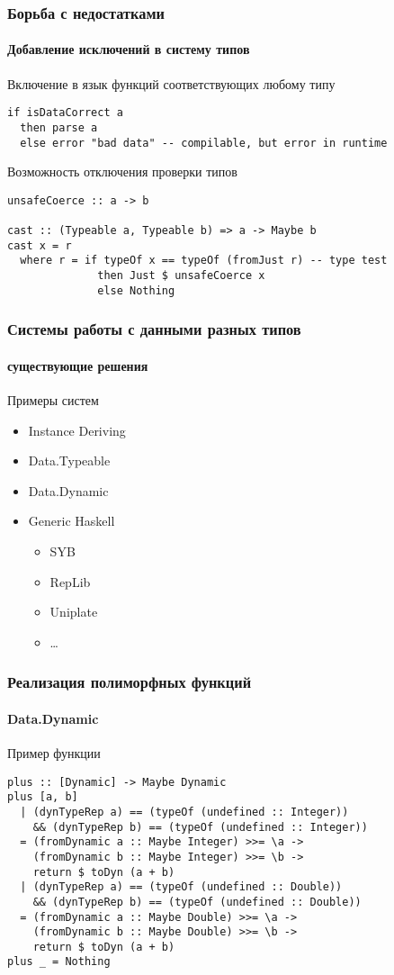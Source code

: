 \documentclass[ucs]{beamer}
\begin{document}

\begin{frame}[fragile]
  \frametitle{Борьба с недостатками}
  \framesubtitle{Добавление исключений в систему типов}

  \begin{block}{Включение в язык функций соответствующих любому типу}
\begin{verbatim}
if isDataCorrect a
  then parse a
  else error "bad data" -- compilable, but error in runtime
\end{verbatim}
  \end{block}

  \begin{block}{Возможность отключения проверки типов}
\begin{verbatim}
unsafeCoerce :: a -> b

cast :: (Typeable a, Typeable b) => a -> Maybe b
cast x = r
  where r = if typeOf x == typeOf (fromJust r) -- type test
              then Just $ unsafeCoerce x
              else Nothing
\end{verbatim}
  \end{block}
\end{frame}

\begin{frame}[fragile]
  \frametitle{Системы работы с данными разных типов}
  \framesubtitle{существующие решения}

  \begin{block}{Примеры систем}
    \begin{itemize}
    \item Instance Deriving
    \item Data.Typeable
    \item Data.Dynamic
    \item Generic Haskell
      \begin{itemize}
      \item SYB
      \item RepLib
      \item Uniplate
      \item \dots
      \end{itemize}
    \end{itemize}
  \end{block}
\end{frame}

\begin{frame}[fragile]
  \frametitle{Реализация полиморфных функций}
  \framesubtitle{Data.Dynamic}

  \begin{block}{Пример функции}
\begin{verbatim}
plus :: [Dynamic] -> Maybe Dynamic
plus [a, b]
  | (dynTypeRep a) == (typeOf (undefined :: Integer))
    && (dynTypeRep b) == (typeOf (undefined :: Integer))
  = (fromDynamic a :: Maybe Integer) >>= \a ->
    (fromDynamic b :: Maybe Integer) >>= \b ->
    return $ toDyn (a + b)
  | (dynTypeRep a) == (typeOf (undefined :: Double))
    && (dynTypeRep b) == (typeOf (undefined :: Double))
  = (fromDynamic a :: Maybe Double) >>= \a ->
    (fromDynamic b :: Maybe Double) >>= \b ->
    return $ toDyn (a + b)
plus _ = Nothing
\end{verbatim}
  \end{block}
\end{frame}
\end{document}
